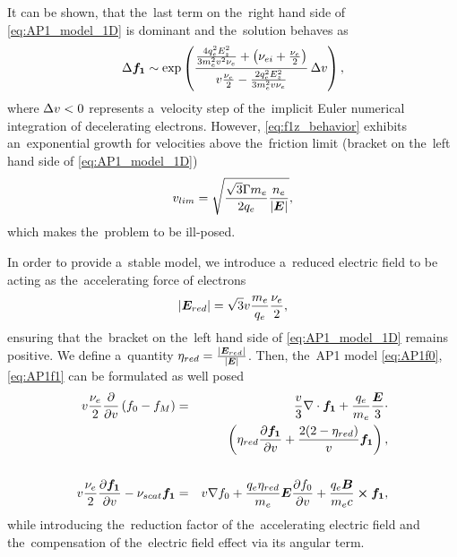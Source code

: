It can be shown, that the~last term on the~right hand side of 
\eqref{eq:AP1_model_1D} is dominant and the~solution behaves as 
\begin{equation}
  \Delta {\boldsymbol{f_1}} \sim \exp\left(\frac{\frac{4q_e^2E_z^2}{3m_e^2v^2\nu_{e}}
  + \left(\nu_{ei} + \frac{\nu_{e}}{2}\right)}
  {v\frac{\nu_{e}}{2} - \frac{2q_e^2E_z^2}{3m_e^2v\nu_{e}}}\, 
  \Delta v\right) ,
  \label{eq:f1z_behavior}
\end{equation}
where $\Delta v < 0$ represents a~velocity step of the~implicit Euler
numerical integration of decelerating electrons.
However, \eqref{eq:f1z_behavior} exhibits an~exponential growth 
for velocities above the~friction limit (bracket on the~left hand side of 
\eqref{eq:AP1_model_1D})
\begin{equation}
  v_{lim}  = \sqrt{\frac{\sqrt{3}\Gamma m_e}{2q_e}\frac{n_e}{|\boldsymbol{E}|}} ,
  \label{app_eq:v_limit}
\end{equation}
which makes the~problem to be ill-posed.

In order to provide a~stable model, we introduce a~reduced electric field
to be acting as the~accelerating force of electrons
\begin{equation}
  |\boldsymbol{E}_{red}| = \sqrt{3} v\frac{m_e}{q_e}\frac{\nu_{e}}{2} ,
  \label{eq:Elimit}
\end{equation}
ensuring that the~bracket on the~left hand side of \eqref{eq:AP1_model_1D}
remains positive. We define a~quantity $\eta_{red} = \frac{|\boldsymbol{E}_{red}|}{|\boldsymbol{E}|}$.
Then, the~AP1 model \eqref{eq:AP1f0}, \eqref{eq:AP1f1} can be formulated 
as well posed 
\begin{eqnarray}
  v\frac{\nu_{e}}{2}\frac{\partial{}}{\partial{v}}\left(f_0 - f_M \right) &=&
  \frac{v}{3}\nabla\cdot{\boldsymbol{f_1}} + \frac{q_e}{m_e}\frac{\boldsymbol{E}}{3}\cdot
  \nonumber \\
  &&\left(
  \eta_{red}\frac{\partial{{\boldsymbol{f_1}}}}{\partial{v}} + \frac{2(2-\eta_{red})}{v}{\boldsymbol{f_1}}\right) , 
  \nonumber \\
  \label{eq:AP1f0_app}\\
  v\frac{\nu_{e}}{2}\frac{\partial{{\boldsymbol{f_1}}}}{\partial{v}}
  - \nu_{scat}{\boldsymbol{f_1}} &=& 
  v\nabla f_0 + 
  \frac{q_e\eta_{red}}{m_e}\boldsymbol{E}\frac{\partial{f_0}}{\partial{v}} 
  +\frac{q_e\boldsymbol{B}}{m_e c}\boldsymbol{\times} {\boldsymbol{f_1}}
  ,
  \nonumber \\
  \label{eq:AP1f1_app}
\end{eqnarray}
while introducing the~reduction factor of the~accelerating electric field
and the~compensation of the~electric field effect via its angular term.  

